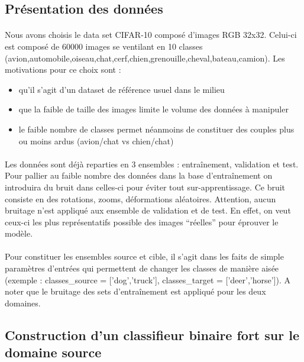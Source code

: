 \documentclass[11 pt]{article}
\begin{document}
\subsection{Présentation des données}
\paragraph{}Nous avons choisis le data set CIFAR-10 composé d’images RGB 32x32. Celui-ci est composé de 60000 images se ventilant en 10 classes (avion,automobile,oiseau,chat,cerf,chien,grenouille,cheval,bateau,camion). Les motivations pour ce choix sont :\\ \medskip
\begin{itemize}
  \item qu’il s’agit d’un dataset de référence usuel dans le milieu
  \item que la faible de taille des images limite le volume des données à manipuler
  \item le faible nombre de classes permet néanmoins de constituer des couples plus ou moins ardus (avion/chat vs chien/chat)
\end{itemize}

\paragraph{}Les données sont déjà reparties en 3 ensembles : entraînement, validation et test. Pour pallier au faible nombre des données dans la base d’entraînement on introduira du bruit dans celles-ci pour éviter tout sur-apprentissage. Ce bruit consiste en des rotations, zooms, déformations aléatoires. Attention, aucun bruitage n’est appliqué aux ensemble de validation et de test. En effet, on veut ceux-ci les plus représentatifs possible des images “réelles” pour éprouver le modèle.

\paragraph{}Pour constituer les ensembles source et cible, il s’agit dans les faits de simple paramètres d’entrées qui permettent de changer les classes de manière aisée (exemple : classes\_source = ['dog','truck'], classes\_target = ['deer','horse']). A noter que le bruitage des sets d’entraînement est appliqué pour les deux domaines.



\subsection{Construction d'un classifieur binaire fort sur le domaine source}
\end{document}
